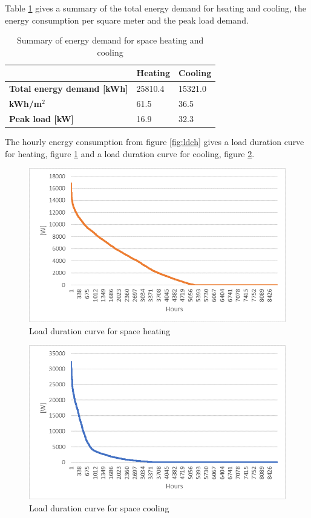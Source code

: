 Table \ref{tab:sum} gives a summary of the total energy demand for heating and cooling, the energy consumption per square meter and the peak load demand. 

\begin{table}[]
    \centering
        \caption{Summary of energy demand for space heating and cooling}
    \begin{tabular}{|p{2.5cm}|p{1.8cm}|p{1.8cm}|}
         \hline
        & \textbf{Heating} & \textbf{Cooling} \\
        \hline
        \textbf{Total energy demand [kWh]} & 25810.4 & 15321.0 \\
        \hline
        \textbf{kWh/m$^2$} & 61.5  & 36.5 \\
        \hline
        \textbf{Peak load [kW]} & 16.9 & 32.3 \\
        \hline
    \end{tabular}
    \label{tab:sum}
\end{table}

The hourly energy consumption from figure \ref{fig:ldch} gives a load duration curve for heating, figure \ref{fig:hload} and a load duration curve for cooling, figure \ref{fig:cload}.

\begin{figure}[h!]
    \centering
    \includegraphics[scale=0.8]{vedlegg/hl1512.png}
    \caption{Load duration curve for space heating}
    \label{fig:hload}
\end{figure}

\begin{figure}[h!]
    \centering
    \includegraphics[scale=0.8]{vedlegg/cl1512.png}
    \caption{Load duration curve for space cooling}
    \label{fig:cload}
\end{figure}

